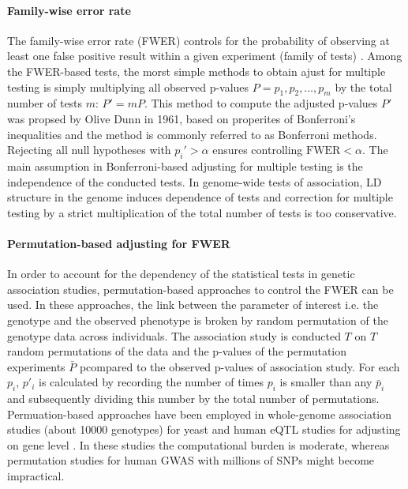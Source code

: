 \paragraph{Family-wise error rate}
The family-wise error rate (FWER) controls for the probability of observing at least one false positive result within a given experiment (family of tests) \citep{Shaffer1995}. Among the FWER-based tests, the morst simple methods to obtain  ajust for multiple testing is simply multiplying all observed p-values \(P=p_1, p_2, \dots, p_m\) by the total number of tests \(m\): \(P' = mP\). This method to compute the adjusted p-values \(P'\) was propsed by Olive Dunn in 1961, based on properites of Bonferroni's inequalities \citep{Dunn1961} and the method is commonly referred to as Bonferroni methods. Rejecting all null hypotheses with \(p_i' > \alpha\) ensures controlling \(\text{FWER} < \alpha\). The main assumption in Bonferroni-based adjusting for multiple testing is the independence of the conducted tests. In genome-wide tests of association, LD structure in the genome induces dependence of tests and correction for multiple testing by a strict multiplication of the total number of tests is too conservative. 

\paragraph{Permutation-based adjusting for FWER}
In order to account for the dependency of the statistical tests in genetic association studies, permutation-based approaches to control the FWER can be used. In these approaches, the link between the parameter of interest i.e. the genotype and the observed phenotype is broken by random permutation of the genotype data across individuals.  The association study is conducted \(T\) on \(T\)  random permutations of the data and the p-values of the permutation experiments \(\bar{P}\) pcompared to the observed p-values of association study. For each \(p_i\),   \(p'_i\)  is calculated by recording the number of times \(p_i\) is smaller than any \(\bar{p}_i\) and subsequently dividing this number by the total number of permutations. Permuation-based approaches have been employed in whole-genome association studies (about \num{10000} genotypes) for yeast \citep{Brem2002,Ehrenreich2010,Bloom2013} and human eQTL studies for adjusting on gene level \citep{1000Genomes2015}. In these studies the computational burden is moderate, whereas permutation studies for human GWAS with millions of SNPs might become impractical. 

